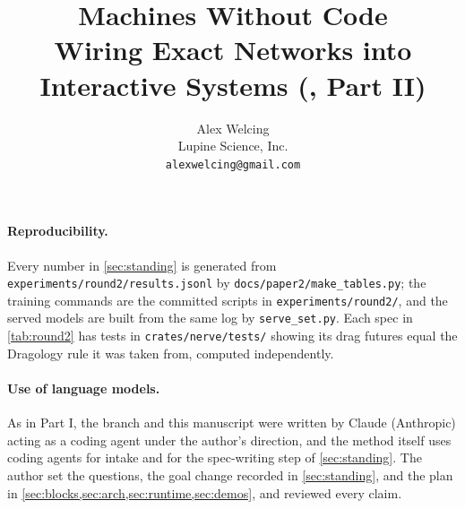 \documentclass{article}
\title{Machines Without Code\\
\large Wiring Exact Networks into Interactive Systems (\method, Part II)}
\author{%
  Alex Welcing\\
  Lupine Science, Inc.\\
  \texttt{alexwelcing@gmail.com}\\
}
\theoremstyle{plain}
\theoremstyle{definition}
\theoremstyle{remark}
\begin{document}
\maketitle

\begin{abstract}

\end{abstract}












\paragraph{Reproducibility.} Every number in \cref{sec:standing} is generated from
\texttt{experiments/round2/results.jsonl} by \texttt{docs/paper2/make\_tables.py}; the training commands are the
committed scripts in \texttt{experiments/round2/}, and the served models are built from the same log by
\texttt{serve\_set.py}. Each spec in \cref{tab:round2} has tests in \texttt{crates/nerve/tests/} showing its drag
futures equal the Dragology rule it was taken from, computed independently.

\paragraph{Use of language models.} As in Part I, the branch and this manuscript were written by Claude (Anthropic)
acting as a coding agent under the author's direction, and the method itself uses coding agents for intake and
for the spec-writing step of \cref{sec:standing}. The author set the questions, the goal change recorded in
\cref{sec:standing}, and the plan in \cref{sec:blocks,sec:arch,sec:runtime,sec:demos}, and reviewed every claim.



\end{document}

